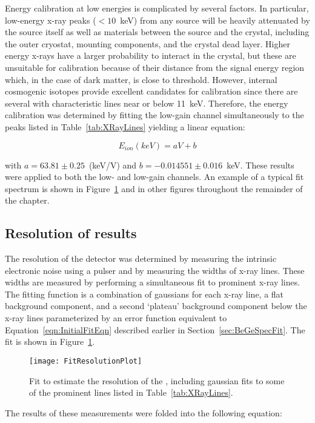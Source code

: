 Energy calibration at low energies is complicated by several factors.  In particular, low-energy x-ray peaks ($<10$~keV) from any source will be heavily attenuated by the source itself as well as materials between the source and the crystal, including the outer cryostat, mounting components, and the crystal dead layer.  Higher energy x-rays have a larger probability to interact in the crystal, but these are unsuitable for calibration because of their distance from the signal energy region which, in the case of dark matter, is close to threshold.  However, internal cosmogenic isotopes provide excellent candidates for calibration since there are several with characteristic lines near or below 11~keV.  Therefore, the energy calibration was determined by fitting the low-gain channel simultaneously to the peaks listed in Table~\ref{tab:XRayLines} yielding a linear equation:

			\[
			E_{ion} (keV) = a V + b
			\]  

with $a = 63.81\pm0.25$~(keV/V) and $b = -0.014551\pm0.016$~keV.  These results were applied to both the low- and low-gain channels.  An example of a typical fit spectrum is shown in Figure~\ref{fig:BeGeResFit} and in other figures throughout the remainder of the chapter.

		\subsection{Resolution of results}

The resolution of the detector was determined by measuring the intrinsic electronic noise using a pulser and by measuring the widths of x-ray lines.  These widths are measured by performing a simultaneous fit to prominent x-ray lines.  The fitting function is a combination of gaussians for each x-ray line, a flat background component, and a second `plateau' background component below the x-ray lines parameterized by an error function equivalent to Equation~\ref{eqn:InitialFitEqn} described earlier in Section~\ref{sec:BeGeSpecFit}.  The fit is shown in Figure~\ref{fig:BeGeResFit}.  
			\begin{figure}
				\centering
				\texttt{[image: FitResolutionPlot]}
				\caption[Estimate of \bege~resolution]
				{Fit to estimate the resolution of the \bege, including gaussian fits to some of the prominent lines listed in Table~\ref{tab:XRayLines}.}
				\label{fig:BeGeResFit}
			\end{figure}
The results of these measurements were folded into the following equation:

